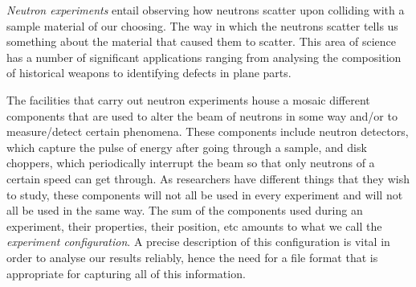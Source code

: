 \textit{Neutron experiments} entail observing how neutrons scatter upon colliding with a sample material of our choosing. The way in which the neutrons scatter tells us something about the material that caused them to scatter. This area of science has a number of significant applications ranging from analysing the composition of historical weapons to identifying defects in plane parts.

The facilities that carry out neutron experiments house a mosaic different components that are used to alter the beam of neutrons in some way and/or to measure/detect certain phenomena. These components include neutron detectors, which capture the pulse of energy after going through a sample, and disk choppers, which periodically interrupt the beam so that only neutrons of a certain speed can get through. As researchers have different things that they wish to study, these components will not all be used in every experiment and will not all be used in the same way. The sum of the components used during an experiment, their properties, their position, etc amounts to what we call the \textit{experiment configuration}. A precise description of this configuration is vital in order to analyse our results reliably, hence the need for a file format that is appropriate for capturing all of this information.
